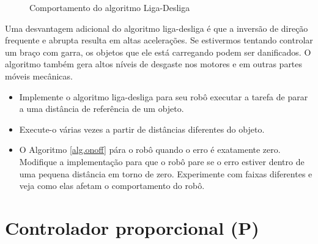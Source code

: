 \begin{figure}
\begin{center}
\caption{Comportamento do algoritmo Liga-Desliga}\label{fig.onoff}
\end{center}
\end{figure}

Uma desvantagem adicional do algoritmo liga-desliga é que a inversão de direção frequente e abrupta resulta em altas acelerações. Se estivermos tentando controlar um braço com garra, os objetos que ele está carregando podem ser danificados. O algoritmo também gera altos níveis de desgaste nos motores e em outras partes móveis mecânicas.

\begin{framed}
\begin{itemize}
\item Implemente o algoritmo liga-desliga para seu robô executar a tarefa de parar a uma distância de referência de um objeto.
\item Execute-o várias vezes a partir de distâncias diferentes do objeto.
\item O Algoritmo \ref{alg.onoff} pára o robô quando o erro é exatamente zero. Modifique a implementação para que o robô pare se o erro estiver dentro de uma pequena distância em torno de zero. Experimente com faixas diferentes e veja como elas afetam o comportamento do robô.
\end{itemize}
\end{framed}

\section{Controlador proporcional (P)}\label{s.p}

